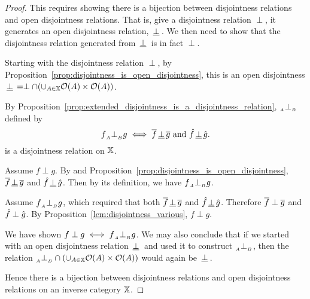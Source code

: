 \begin{proof}
  This requires showing there is a bijection between disjointness relations and open disjointness
  relations. That is, give a disjointness relation $\perp$, it generates an open disjointness
  relation, $\,\underline{\perp}\,$. We then need to show that the disjointness relation generated from
  $\,\underline{\perp}\,$ is in fact $\perp$.

  Starting with the disjointness relation $\perp$, by
  Proposition~\ref{prop:disjointness_is_open_disjointness}, this is an open disjointness $\,\underline{\perp}\, =
  \perp \cap (\cup_{A\in\mathbb{X}}\mathcal{O}({A})\times\mathcal{O}({A}))$.

  By Proposition~\ref{prop:extended_disjointness_is_a_disjointness_relation}, ${}_{{}_{A}}{\perp_{{}_{B}}}$ defined by
  \[
    f{}_{{}_{A}}{\perp_{{}_{B}}} g \iff  \overline{f}\,\underline{\perp}\,\overline{g}  \text{ and }  \hat{f}\,\underline{\perp}\,\hat{g}.
  \]
  is a disjointness relation on $\mathbb{X}$.

  Assume $f\perp g$. By  and Proposition~\ref{prop:disjointness_is_open_disjointness},
  $\overline{f}\,\underline{\perp}\,\overline{g}$ and $\hat{f}\,\underline{\perp}\,\hat{g}$. Then by its definition, we have $f {}_{{}_{A}}{\perp_{{}_{B}}} g$.

  Assume $f {}_{{}_{A}}{\perp_{{}_{B}}} g$, which required that both $\overline{f}\,\underline{\perp}\,\overline{g}$ and
  $\hat{f}\,\underline{\perp}\,\hat{g}$. Therefore $\overline{f}\perp\overline{g}$ and  $\hat{f}\perp\hat{g}$. By
  Proposition~\ref{lem:disjointness_various}, $f \perp g$.

  We have shown $f \perp g \iff f{}_{{}_{A}}{\perp_{{}_{B}}} g$. We may also conclude that if we started with an open
  disjointness relation $\,\underline{\perp}\,$ and used it to construct ${}_{{}_{A}}{\perp_{{}_{B}}}$, then the relation ${}_{{}_{A}}{\perp_{{}_{B}}}
  \cap (\cup_{A\in\mathbb{X}}\mathcal{O}({A})\times\mathcal{O}({A}))$ would again be $\,\underline{\perp}\,$.

  Hence there is a bijection between disjointness relations and open disjointness relations on
  an inverse category $\mathbb{X}$.
\end{proof}


